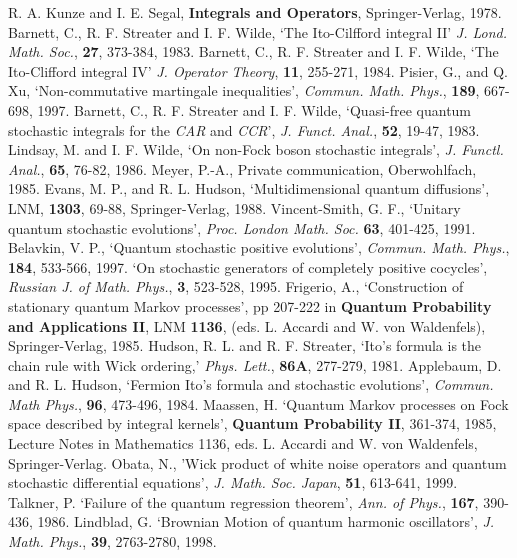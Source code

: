  R. A. Kunze and I. E. Segal, {\bf Integrals and
Operators}, Springer-Verlag, 1978.
 Barnett, C., R. F. Streater and I. F. Wilde,
`The Ito-Cilfford integral II' {\em J. Lond. Math. Soc.}, {\bf 27},
373-384, 1983.
 Barnett, C., R. F. Streater and I. F. Wilde, `The
Ito-Clifford integral IV' {\em J. Operator Theory}, {\bf 11}, 255-271, 1984.
 Pisier, G., and Q. Xu, `Non-commutative martingale
inequalities', {\em Commun. Math. Phys.}, {\bf 189}, 667-698, 1997.
 Barnett, C., R. F. Streater and I. F. Wilde, `Quasi-free
quantum stochastic integrals for the {\em CAR} and {\em CCR}',
{\em J. Funct. Anal.}, {\bf 52}, 19-47, 1983.
 Lindsay, M. and I. F. Wilde, `On non-Fock boson
stochastic integrals', {\em J. Functl. Anal.}, {\bf 65}, 76-82, 1986.
 Meyer, P.-A., Private communication, Oberwohlfach, 1985.
 Evans, M. P., and R. L. Hudson, `Multidimensional quantum
diffusions', LNM, {\bf 1303}, 69-88, Springer-Verlag, 1988.
 Vincent-Smith, G. F., `Unitary quantum stochastic evolutions',
{\em Proc. London Math. Soc.} {\bf 63}, 401-425, 1991.
 Belavkin, V. P., `Quantum stochastic positive
evolutions', {\em Commun. Math. Phys.}, {\bf 184}, 533-566, 1997. `On stochastic
generators of completely positive cocycles', {\em Russian J. of Math.
Phys.}, {\bf 3}, 523-528, 1995.
 Frigerio, A., `Construction of stationary quantum Markov
processes', pp 207-222 in {\bf Quantum Probability and Applications II},  
LNM {\bf 1136}, (eds. L. Accardi and W. von Waldenfels), Springer-Verlag,
1985.
 Hudson, R. L. and R. F. Streater, `Ito's formula is
the chain rule with Wick ordering,' {\em Phys. Lett.}, {\bf 86A}, 277-279,
1981.
 Applebaum, D. and R. L. Hudson, `Fermion Ito's formula
and stochastic evolutions', {\em Commun. Math Phys.}, {\bf 96},
473-496, 1984.
 Maassen, H. `Quantum Markov processes on Fock space
described by integral kernels', {\bf Quantum Probability II}, 361-374, 1985,
Lecture Notes in Mathematics 1136, eds. L. Accardi and W. von Waldenfels,
Springer-Verlag.
 Obata, N., 'Wick product of white noise operators and
quantum stochastic differential equations', {\em J. Math. Soc. Japan},
{\bf 51}, 613-641, 1999.
 Talkner, P. `Failure of the quantum regression
theorem', {\em Ann. of Phys.}, {\bf 167}, 390-436, 1986.
 Lindblad, G. `Brownian Motion of quantum harmonic
oscillators', {\em J. Math. Phys.}, {\bf 39}, 2763-2780, 1998.
